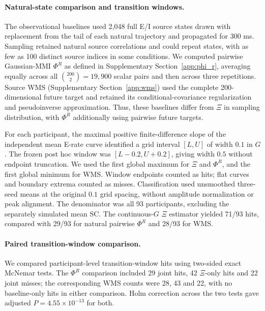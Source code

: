 \documentclass[fleqn,10pt]{wlscirep}
\begin{document}
\paragraph{Natural-state comparison and transition windows.}
The observational baselines used 2,048 full E/I source states drawn with replacement from the tail of each natural trajectory and propagated for 300 ms. Sampling retained natural source correlations and could repeat states, with as few as 100 distinct source indices in some conditions. We computed pairwise Gaussian-MMI $\Phi^R$ as defined in Supplementary Section~\ref{app:phi_r}, averaging equally across all $\binom{200}{2}=19{,}900$ scalar pairs and then across three repetitions. Source WMS (Supplementary Section~\ref{app:wms}) used the complete 200-dimensional future target and retained its conditional-covariance regularization and pseudoinverse approximation. Thus, these baselines differ from $\Xi$ in sampling distribution, with $\Phi^R$ additionally using pairwise future targets.

For each participant, the maximal positive finite-difference slope of the independent mean E-rate curve identified a grid interval $[L,U]$ of width $0.1$ in $G$. The frozen post hoc window was $[L-0.2,U+0.2]$, giving width $0.5$ without endpoint truncation. We used the first global maximum for $\Xi$ and $\Phi^R$, and the first global minimum for WMS. Window endpoints counted as hits; flat curves and boundary extrema counted as misses. Classification used unsmoothed three-seed means at the original $0.1$ grid spacing, without amplitude normalization or peak alignment. The denominator was all 93 participants, excluding the separately simulated mean SC. The continuous-$G$ $\Xi$ estimator yielded 71/93 hits, compared with 29/93 for natural pairwise $\Phi^R$ and 28/93 for WMS.

\paragraph{Paired transition-window comparison.}
We compared participant-level transition-window hits using two-sided exact McNemar tests. The $\Phi^R$ comparison included 29 joint hits, 42 $\Xi$-only hits and 22 joint misses; the corresponding WMS counts were 28, 43 and 22, with no baseline-only hits in either comparison. Holm correction across the two tests gave adjusted $P=4.55\times10^{-13}$ for both.
\end{document}
